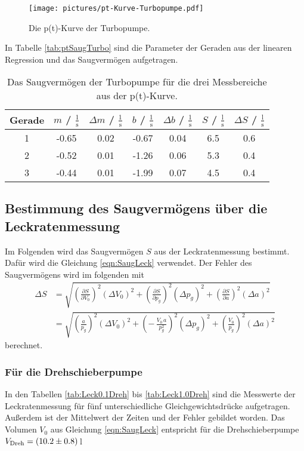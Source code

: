 \begin{figure} %
  \centering
  \texttt{[image: pictures/pt-Kurve-Turbopumpe.pdf]}
  \caption{Die p(t)-Kurve der Turbopumpe.}
  \label{fig:ptturbo}
\end{figure}

In Tabelle \eqref{tab:ptSaugTurbo} sind die Parameter der Geraden aus der linearen Regression und das Saugvermögen aufgetragen.

\begin{table}
  \centering
  \caption{Das Saugvermögen der Turbopumpe für die drei Messbereiche aus der p(t)-Kurve.}
  \label{tab:ptSaugTurbo}
    \begin{tabular}{c|c|c|c|c|c|c}
      Gerade & $m$ / $\frac{1}{\text{s}}$ & $\Delta m$ / $\frac{1}{\text{s}}$ & $b$ / $\frac{1}{\text{s}}$ & $\Delta b$ / $\frac{1}{\text{s}}$ & $S$ / $\frac{\text{l}}{\text{s}}$ & $\Delta S$ / $\frac{\text{l}}{\text{s}}$ \\
      \midrule
      1 & -0.65 & 0.02 & -0.67 & 0.04 & 6.5 & 0.6 \\
      2 & -0.52 & 0.01 & -1.26 & 0.06 & 5.3 & 0.4 \\
      3 & -0.44 & 0.01 & -1.99 & 0.07 & 4.5 & 0.4 \\
    \end{tabular}
\end{table}



\subsection{Bestimmung des Saugvermögens über die Leckratenmessung}
Im Folgenden wird das Saugvermögen $S$ aus der Leckratenmessung bestimmt. Dafür wird die Gleichung \eqref{eqn:SaugLeck} verwendet. Der Fehler des Saugvermögens wird im folgenden mit
\begin{align}
  \Delta S &= \sqrt{ \left(\frac{\partial S}{\partial V_0} \right)^2 (\Delta V_0)^2 + \left(\frac{\partial S}{\partial p_g} \right)^2 (\Delta p_g)^2 + \left(\frac{\partial S}{\partial a} \right)^2 (\Delta a)^2 } \nonumber \\
  &= \sqrt{ \left(\frac{a}{p_g} \right)^2 (\Delta V_0)^2 + \left(-\,\frac{V_0\,a}{p_g^2} \right)^2 (\Delta p_g)^2 + \left(\frac{V_0}{p_g} \right)^2 (\Delta a)^2 }
\end{align}
berechnet.



\subsubsection{Für die Drehschieberpumpe}
In den Tabellen \eqref{tab:Leck0.1Dreh} bis \eqref{tab:Leck1.0Dreh} sind die Messwerte der Leckratenmessung für fünf unterschiedliche Gleichgewichtsdrücke aufgetragen. Außerdem ist der Mittelwert der Zeiten und der Fehler gebildet worden. Das Volumen $V_0$ aus Gleichung \eqref{eqn:SaugLeck} entspricht für die Drehschieberpumpe $V_\text{Dreh} = (\num{10.2 +- 0.8})$\,l

